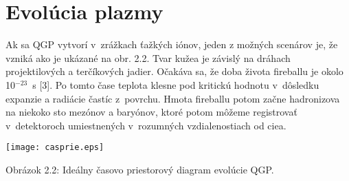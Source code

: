 % 
% 
% 
% 
% 

\section{Evolúcia plazmy}
Ak sa QGP vytvorí v~zrážkach ťažkých iónov,
jeden z možných scenárov je, že vzniká ako je ukázané na obr. 2.2.
Tvar kuže\softl{}a je závislý na dráhach projektilových a
terčíkových  jadier. Očakáva sa, že doba
života fireballu   je okolo  10$^{-23}$~s [3]. Po tomto čase
teplota klesne pod kritickú hodnotu v~dôsledku expanzie a radiácie
častíc z~povrchu. Hmota fireballu potom začne
hadronizova\softt{} na nieko\softl{}ko sto mezónov a baryónov, ktoré 
potom môžeme 
registrovať v~detektoroch umiestnených v~rozumných vzdialenostiach
od cie\softl{}a.
\begin{center}
\texttt{[image: casprie.eps]}
\end{center}
\begin{center}
  Obrázok 2.2: Ideálny časovo priestorový diagram evolúcie QGP.
\end{center}


